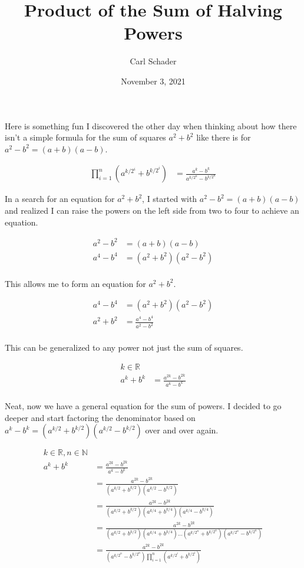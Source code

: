 \documentclass{article}
\title{Product of the Sum of Halving Powers}
\author{Carl Schader}
\date{November 3, 2021}
\begin{document}
\maketitle

Here is something fun I discovered the other day when thinking about how there isn't a simple formula for the sum of squares $a^2 + b^2$ like there is for $a^2 - b^2 = (a+b)(a-b)$.

\begin{align*}
    \prod_{i=1}^{n}{\left(a^{k/{2^i}} + b^{k/{2^i}}\right)} &= \frac{a^k - b^k}{a^{k/{2^n}}-b^{k/{2^n}}}
\end{align*}

In a search for an equation for $a^2+b^2$, I started with $a^2-b^2=(a+b)(a-b)$ and realized I can raise the powers on the left side from two to four to achieve an equation.

\begin{align*}
    a^2-b^2 &= (a+b)(a-b)\\
    a^4-b^4 &= (a^2+b^2)(a^2-b^2)\\
\end{align*}

This allows me to form an equation for $a^2+b^2$.

\begin{align*}
    a^4-b^4 &= (a^2+b^2)(a^2-b^2)\\
    a^2+b^2 &= \frac{a^4-b^4}{a^2-b^2}\\
\end{align*}

This can be generalized to any power not just the sum of squares.

\begin{align*}
    k\in\mathbb{R}\\
    a^k+b^k &= \frac{a^{2k}-b^{2k}}{a^k-b^k}\\
\end{align*}

\newpage

Neat, now we have a general equation for the sum of powers. I decided to go deeper and start factoring the denominator based on \\$a^k-b^k=(a^{k/2}+b^{k/2})(a^{k/2}-b^{k/2})$ over and over again.

\begin{align*}
    k\in\mathbb{R}, n\in\mathbb{N}\\
    a^k+b^k &= \frac{a^{2k}-b^{2k}}{a^k-b^k}\\
    &= \frac{a^{2k}-b^{2k}}{(a^{k/2}+b^{k/2})(a^{k/2}-b^{k/2})}\\
    &= \frac{a^{2k}-b^{2k}}{(a^{k/2}+b^{k/2})(a^{k/4}+b^{k/4})(a^{k/4}-b^{k/4})}\\
    &= \frac{a^{2k}-b^{2k}}{(a^{k/2}+b^{k/2})(a^{k/4}+b^{k/4})\dots(a^{k/{2^n}}+b^{k/{2^n}})(a^{k/{2^n}}-b^{k/{2^n}})}\\
    &= \frac{a^{2k}-b^{2k}}{(a^{k/{2^n}}-b^{k/{2^n}})\prod_{i=1}^{n}{\left(a^{k/{2^i}} + b^{k/{2^i}}\right)}}\\
\end{align*}
\end{document}
